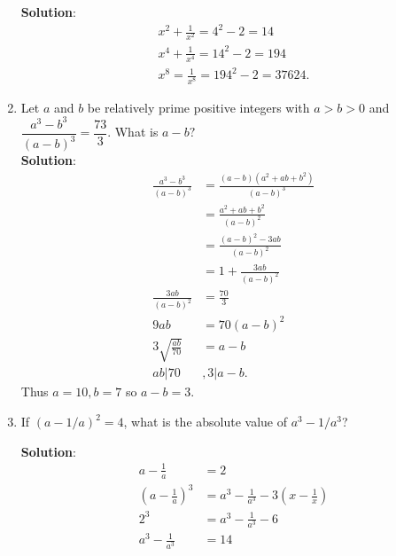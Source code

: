 \begin{enumerate}
  \textbf{Solution}:
  \begin{align*}
    x^2 + \frac{1}{x^2} = 4^2 - 2 = 14 \\
    x^4 + \frac{1}{x^4} = 14^2 - 2 = 194 \\
    x^8 = \frac{1}{x^8} = 194^2 - 2 = \boxed{37624}.
  \end{align*}
  \item Let $a$ and $b$ be relatively prime positive integers with $a>b>0$ and $\dfrac{a^3-b^3}{(a-b)^3} = \dfrac{73}{3}.$ What is $a-b?$
  \\ \textbf{Solution}:
  \begin{align*}
    \frac{a^3-b^3}{(a-b)^3} &= \frac{(a-b)(a^2+ab+b^2)}{(a-b)^3} \\
    &= \frac{a^2+ab+b^2}{(a-b)^2} \\
    &= \frac{(a-b)^2 - 3ab}{(a-b)^2} \\
    &= 1+\frac{3ab}{(a-b)^2} \\
    \frac{3ab}{(a-b)^2} &= \frac{70}{3} \\
    9ab &= 70(a-b)^2 \\
    3 \sqrt{\frac{ab}{70}} &= a - b \\
    ab | 70&, 3 | a - b.
  \end{align*}
  Thus $a = 10, b = 7$ so $a - b = \boxed{3}$. 
  \item If $(a - 1/a)^2 = 4$, what is the absolute value of $a^3 - 1/a^3$? 

  \textbf{Solution}:
  \begin{align*}
    a - \frac{1}{a} &= 2 \\
    (a - \frac{1}{a})^3 &= a^3 - \frac{1}{a^3} - 3(x - \frac{1}{x}) \\
    2^3 &= a^3 - \frac{1}{a^3} - 6 \\
    a^3 - \frac{1}{a^3} &= \boxed{14}
  \end{align*}
\end{enumerate}
